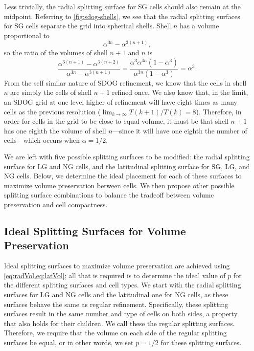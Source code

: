 Less trivially, the radial splitting surface for SG cells should also remain at the midpoint.
Referring to \cref{fig:sdog-shells}, we see that the radial splitting surfaces for SG cells separate the grid into spherical shells.
Shell $n$ has a volume proportional to
%
\begin{equation*}
\alpha^{3n} - \alpha^{3 \left( n + 1 \right)},
\end{equation*}
%
so the ratio of the volumes of shell $n+1$ and $n$ is
%
\begin{equation*} \label{eq:shellVolume}
\frac{ \alpha^{3 \left(n + 1 \right)} - \alpha^{3\left( n + 2 \right)} }{ \alpha^{3n} - \alpha^{3 \left( n + 1 \right)} } = \frac{ \alpha^{3} \alpha^{3n} \left( 1 - \alpha^{3} \right) }{ \alpha^{3n} \left( 1 - \alpha^{3} \right) } = \alpha^{3}.
\end{equation*}
%
From the self similar nature of SDOG refinement, we know that the cells in shell $n$ are simply the cells of shell $n+1$ refined once.
We also know that, in the limit, an SDOG grid at one level higher of refinement will have eight times as many cells as the previous resolution ($\lim_{k \to \infty} T(k+1) / T(k)  = 8 $).
Therefore, in order for cells in the grid to be close to equal volume, it must be that shell $n+1$ has one eighth the volume of shell $n$---since it will have one eighth the number of cells---which occurs when $\alpha = 1 / 2$.


We are left with five possible splitting surfaces to be modified: the radial splitting surface for LG and NG cells, and the latitudinal splitting surface for SG, LG, and NG cells.
Below, we determine the ideal placement for each of these surfaces to maximize volume preservation between cells.
We then propose other possible splitting surface combinations to balance the tradeoff between volume preservation and cell compactness.


\subsection{Ideal Splitting Surfaces for Volume Preservation} \label{chap:4:ideal}
Ideal splitting surfaces to maximize volume preservation are achieved using \cref{eq:radVol,eq:latVol}; all that is required is to determine the ideal value of $p$ for the different splitting surfaces and cell types.
We start with the radial splitting surfaces for LG and NG cells and the latitudinal one for NG cells, as these surfaces behave the same as regular refinement.
Specifically, these splitting surfaces result in the same number and type of cells on both sides, a property that also holds for their children.
We call these the regular splitting surfaces.
Therefore, we require that the volume on each side of the regular splitting surfaces be equal, or in other words, we set $p = 1/2$ for these splitting surfaces.


